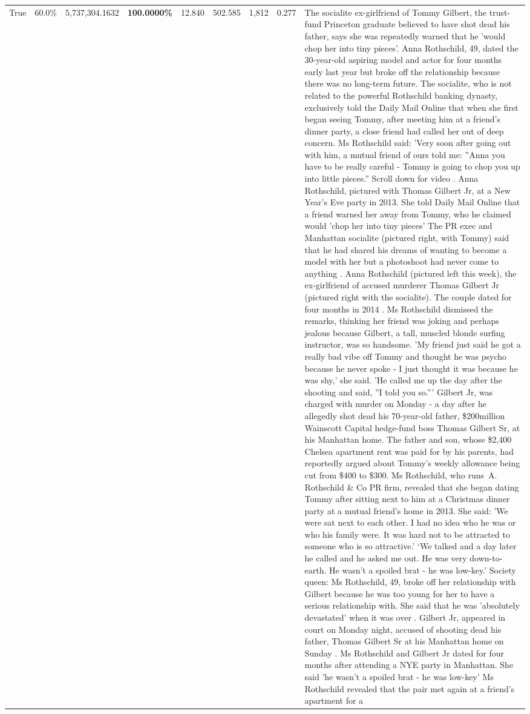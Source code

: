 \begin{table}[H]
\begin{tabular}{lllrlllll}
True & 60.0\% & 5,737,304.1632 & \bfseries \color{red} 100.0000\% & 12.840 & 502.585 & 1,812 & 0.277 & The socialite ex-girlfriend of Tommy Gilbert, the trust-fund Princeton graduate believed to have shot dead his father, says she was repeatedly warned that he 'would chop her into tiny pieces'. Anna Rothschild, 49, dated the 30-year-old aspiring model and actor for four months early last year but broke off the relationship because there was no long-term future. The socialite, who is not related to the powerful Rothschild banking dynasty, exclusively told the Daily Mail Online that when she first began seeing Tommy, after meeting him at a friend's dinner party, a close friend had called her out of deep concern. Ms Rothschild said: 'Very soon after going out with him, a mutual friend of ours told me: ''Anna you have to be really careful - Tommy is going to chop you up into little pieces.'' Scroll down for video . Anna Rothschild, pictured with Thomas Gilbert Jr, at a New Year's Eve party in 2013. She told Daily Mail Online that a friend warned her away from Tommy, who he claimed would 'chop her into tiny pieces' The PR exec and Manhattan socialite (pictured right, with Tommy) said that he had shared his dreams of wanting to become a model with her but a photoshoot had never come to anything . Anna Rothschild (pictured left this week), the ex-girlfriend of accused murderer Thomas Gilbert Jr (pictured right with the socialite). The couple dated for four months in 2014 . Ms Rothschild dismissed the remarks, thinking her friend was joking and perhaps jealous because Gilbert, a tall, muscled blonde surfing instructor, was so handsome. 'My friend just said he got a really bad vibe off Tommy and thought he was psycho because he never spoke - I just thought it was because he was shy,' she said. 'He called me up the day after the shooting and said, ''I told you so.''' Gilbert Jr, was charged with murder on Monday - a day after he allegedly shot dead his 70-year-old father, \$200million Wainscott Capital hedge-fund boss Thomas Gilbert Sr, at his Manhattan home. The father and son, whose \$2,400 Chelsea apartment rent was paid for by his parents, had reportedly argued about Tommy's weekly allowance being cut from \$400 to \$300. Ms Rothschild, who runs A. Rothschild \& Co PR firm, revealed that she began dating Tommy after sitting next to him at a Christmas dinner party at a mutual friend's home in 2013. She said: 'We were sat next to each other. I had no idea who he was or who his family were. It was hard not to be attracted to someone who is so attractive.' ‘We talked and a day later he called and he asked me out. He was very down-to-earth. He wasn’t a spoiled brat - he was low-key.’ Society queen: Ms Rothschild, 49, broke off her relationship with Gilbert because he was too young for her to have a serious relationship with. She said that he was 'absolutely devastated' when it was over . Gilbert Jr, appeared in court on Monday night, accused of shooting dead his father, Thomas Gilbert Sr at his Manhattan home on Sunday . Ms Rothschild and Gilbert Jr dated for four months after attending a NYE party in Manhattan. She said 'he wasn't a spoiled brat - he was low-key' Ms Rothschild revealed that the pair met again at a friend’s apartment for a 
\end{tabular}
\end{table}
